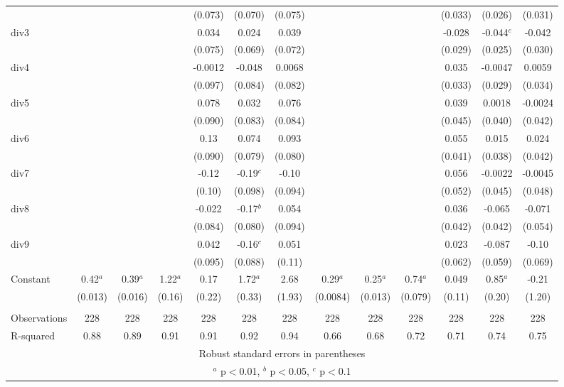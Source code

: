 \documentclass[]{article}
\begin{document}
\begin{tabular}{lcccccccccccc}
 &  &  &  & (0.073) & (0.070) & (0.075) &  &  &  & (0.033) & (0.026) & (0.031) \\
div3 &  &  &  & 0.034 & 0.024 & 0.039 &  &  &  & -0.028 & -0.044$^c$ & -0.042 \\
 &  &  &  & (0.075) & (0.069) & (0.072) &  &  &  & (0.029) & (0.025) & (0.030) \\
div4 &  &  &  & -0.0012 & -0.048 & 0.0068 &  &  &  & 0.035 & -0.0047 & 0.0059 \\
 &  &  &  & (0.097) & (0.084) & (0.082) &  &  &  & (0.033) & (0.029) & (0.034) \\
div5 &  &  &  & 0.078 & 0.032 & 0.076 &  &  &  & 0.039 & 0.0018 & -0.0024 \\
 &  &  &  & (0.090) & (0.083) & (0.084) &  &  &  & (0.045) & (0.040) & (0.042) \\
div6 &  &  &  & 0.13 & 0.074 & 0.093 &  &  &  & 0.055 & 0.015 & 0.024 \\
 &  &  &  & (0.090) & (0.079) & (0.080) &  &  &  & (0.041) & (0.038) & (0.042) \\
div7 &  &  &  & -0.12 & -0.19$^c$ & -0.10 &  &  &  & 0.056 & -0.0022 & -0.0045 \\
 &  &  &  & (0.10) & (0.098) & (0.094) &  &  &  & (0.052) & (0.045) & (0.048) \\
div8 &  &  &  & -0.022 & -0.17$^b$ & 0.054 &  &  &  & 0.036 & -0.065 & -0.071 \\
 &  &  &  & (0.084) & (0.080) & (0.094) &  &  &  & (0.042) & (0.042) & (0.054) \\
div9 &  &  &  & 0.042 & -0.16$^c$ & 0.051 &  &  &  & 0.023 & -0.087 & -0.10 \\
 &  &  &  & (0.095) & (0.088) & (0.11) &  &  &  & (0.062) & (0.059) & (0.069) \\
Constant & 0.42$^a$ & 0.39$^a$ & 1.22$^a$ & 0.17 & 1.72$^a$ & 2.68 & 0.29$^a$ & 0.25$^a$ & 0.74$^a$ & 0.049 & 0.85$^a$ & -0.21 \\
 & (0.013) & (0.016) & (0.16) & (0.22) & (0.33) & (1.93) & (0.0084) & (0.013) & (0.079) & (0.11) & (0.20) & (1.20) \\
 &  &  &  &  &  &  &  &  &  &  &  &  \\
Observations & 228 & 228 & 228 & 228 & 228 & 228 & 228 & 228 & 228 & 228 & 228 & 228 \\
 R-squared & 0.88 & 0.89 & 0.91 & 0.91 & 0.92 & 0.94 & 0.66 & 0.68 & 0.72 & 0.71 & 0.74 & 0.75 \\ \hline
\multicolumn{13}{c}{ Robust standard errors in parentheses} \\
\multicolumn{13}{c}{ $^a$ p$<$0.01, $^b$ p$<$0.05, $^c$ p$<$0.1} \\
\end{tabular}
\end{document}
